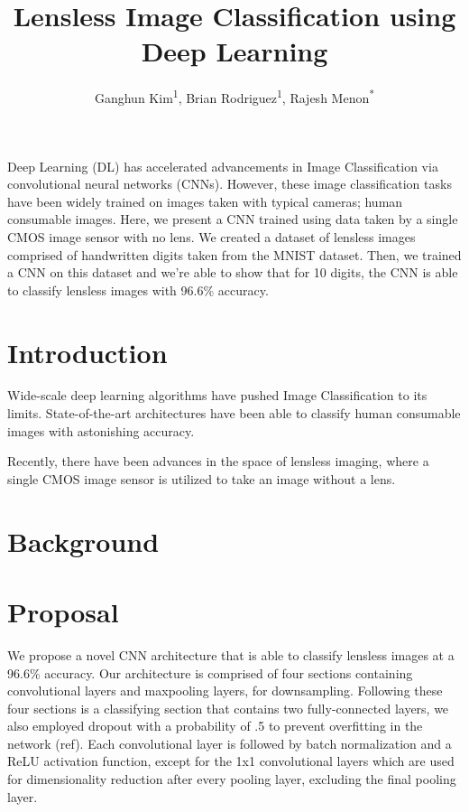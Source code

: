\documentclass[12pt,conference]{ieeeconf}
\begin{document}
\title{Lensless Image Classification using Deep Learning}
\author{Ganghun Kim\textsuperscript{1}, Brian Rodriguez\textsuperscript{1}, Rajesh Menon\textsuperscript{*}}
\maketitle

\abstract
Deep Learning (DL) has accelerated advancements in Image Classification via convolutional neural networks (CNNs). However, these image classification tasks have been widely trained on images taken with typical cameras; human consumable images. Here, we present a CNN trained using data taken by a single CMOS image sensor with no lens. We created a dataset of lensless images comprised of handwritten digits taken from the MNIST dataset. Then, we trained a CNN on this dataset and we're able to show that for 10 digits, the CNN is able to classify lensless images with 96.6\% accuracy.

\section{Introduction}
Wide-scale deep learning algorithms have pushed Image Classification to its limits. State-of-the-art architectures have been able to classify human consumable images with astonishing accuracy. 

Recently, there have been advances in the space of lensless imaging, where a single CMOS image sensor is utilized to take an image without a lens.

\section{Background}

\section{Proposal}
We propose a novel CNN architecture that is able to classify lensless images at a 96.6\% accuracy. Our architecture is comprised of four sections containing convolutional layers and maxpooling layers, for downsampling. Following these four sections is a classifying section that contains two fully-connected layers, we also employed dropout with a probability of .5 to prevent overfitting in the network (ref). Each convolutional layer is followed by batch normalization and a ReLU activation function, except for the 1x1 convolutional layers which are used for dimensionality reduction after every pooling layer, excluding the final pooling layer.
\end{document}
